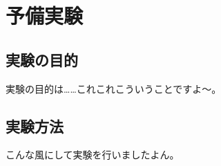 \chapter{予備実験}
\label{CExperiment}

\section{実験の目的}
\label{SExperimentPurpose}

実験の目的は……これこれこういうことですよ～。

\section{実験方法}
\label{SExperimentMethod}

こんな風にして実験を行いましたよん。
